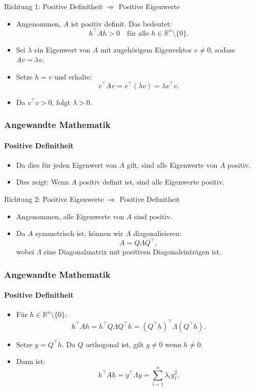 \documentclass{beamer}
\begin{document}
 \begin{frame}{Richtung 1: Positive Definitheit \( \Rightarrow \) Positive Eigenwerte}
     \begin{itemize}
         \item Angenommen, \( A \) ist positiv definit. Das bedeutet:
         \[
         h^\top A h > 0 \quad \text{für alle } h \in \mathbb{R}^n \setminus \{0\}.
         \]
         \item Sei \( \lambda \) ein Eigenwert von \( A \) mit zugehörigem Eigenvektor \( v \neq 0 \), sodass \( A v = \lambda v \).
         \item Setze \( h = v \) und erhalte:
         \[
         v^\top A v = v^\top (\lambda v) = \lambda v^\top v.
         \]
         \item Da \( v^\top v > 0 \), folgt \( \lambda > 0 \).
     \end{itemize}
 \end{frame}
 
 \begin{frame}
    \frametitle{Angewandte Mathematik}
    \framesubtitle{Positive Definitheit}
     \begin{itemize}
         \item Da dies für jeden Eigenwert von \( A \) gilt, sind alle Eigenwerte von \( A \) positiv.
         \item Dies zeigt: Wenn \( A \) positiv definit ist, sind alle Eigenwerte positiv.
     \end{itemize}
 \end{frame}
 
 \begin{frame}{Richtung 2: Positive Eigenwerte \( \Rightarrow \) Positive Definitheit}
     \begin{itemize}
         \item Angenommen, alle Eigenwerte von \( A \) sind positiv.
         \item Da \( A \) symmetrisch ist, können wir \( A \) diagonalisieren:
         \[
         A = Q \Lambda Q^\top,
         \]
         wobei \( \Lambda \) eine Diagonalmatrix mit positiven Diagonaleinträgen ist.
     \end{itemize}
 \end{frame}
 
 \begin{frame}
    \frametitle{Angewandte Mathematik}
    \framesubtitle{Positive Definitheit}
     \begin{itemize}
         \item Für \( h \in \mathbb{R}^n \setminus \{0\} \):
         \[
         h^\top A h = h^\top Q \Lambda Q^\top h = (Q^\top h)^\top \Lambda (Q^\top h).
         \]
         \item Setze \( y = Q^\top h \). Da \( Q \) orthogonal ist, gilt \( y \neq 0 \) wenn \( h \neq 0 \).
         \item Dann ist:
         \[
         h^\top A h = y^\top \Lambda y = \sum_{i=1}^n \lambda_i y_i^2.
         \]
     \end{itemize}
 \end{frame}
 
\end{document}
